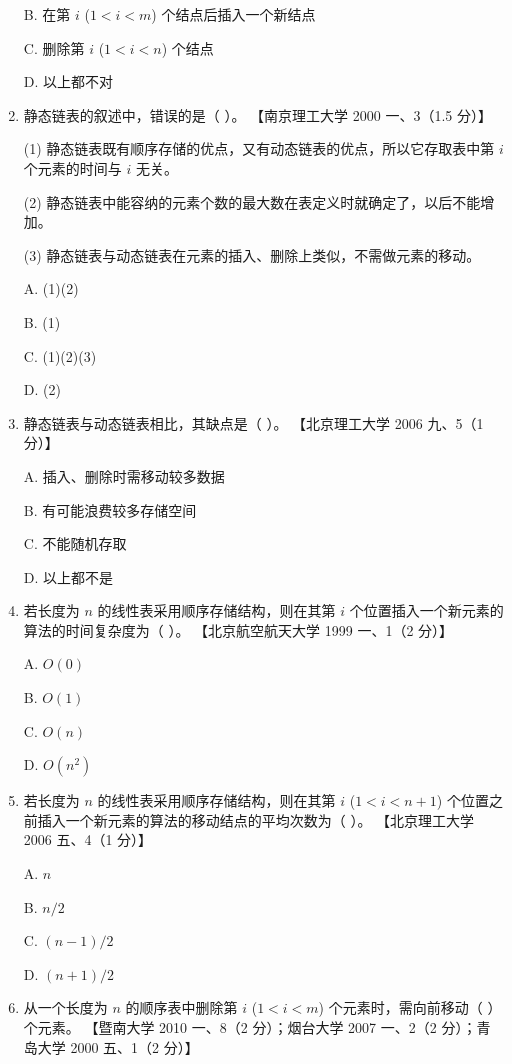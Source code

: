\documentclass[lang=cn,newtx,10pt,scheme=chinese]{../../elegantbook}
\begin{document}
\begin{enumerate}
    B. 在第 $i$ ($1 < i < m$) 个结点后插入一个新结点  

    C. 删除第 $i$ ($1 < i < n$) 个结点  

    D. 以上都不对  

    \item 静态链表的叙述中，错误的是（ ）。  
    【南京理工大学 2000 一、3（1.5 分）】  

    (1) 静态链表既有顺序存储的优点，又有动态链表的优点，所以它存取表中第 $i$ 个元素的时间与 $i$ 无关。  

    (2) 静态链表中能容纳的元素个数的最大数在表定义时就确定了，以后不能增加。  

    (3) 静态链表与动态链表在元素的插入、删除上类似，不需做元素的移动。  

    A. (1)(2)  

    B. (1)  

    C. (1)(2)(3)  

    D. (2)  

    \item 静态链表与动态链表相比，其缺点是（ ）。  
    【北京理工大学 2006 九、5（1 分）】  

    A. 插入、删除时需移动较多数据  

    B. 有可能浪费较多存储空间  

    C. 不能随机存取  

    D. 以上都不是  

    \item 若长度为 $n$ 的线性表采用顺序存储结构，则在其第 $i$ 个位置插入一个新元素的算法的时间复杂度为（ ）。  
    【北京航空航天大学 1999 一、1（2 分）】  

    A. $O(0)$  

    B. $O(1)$  

    C. $O(n)$  

    D. $O(n^2)$  

    \item 若长度为 $n$ 的线性表采用顺序存储结构，则在其第 $i$ ($1 < i < n+1$) 个位置之前插入一个新元素的算法的移动结点的平均次数为（ ）。  
    【北京理工大学 2006 五、4（1 分）】  

    A. $n$  

    B. $n/2$  

    C. $(n-1)/2$  

    D. $(n+1)/2$  

    \item 从一个长度为 $n$ 的顺序表中删除第 $i$ ($1 < i < m$) 个元素时，需向前移动（ ）个元素。  
    【暨南大学 2010 一、8（2 分）；烟台大学 2007 一、2（2 分）；青岛大学 2000 五、1（2 分）】  


\end{enumerate}
\end{document}
